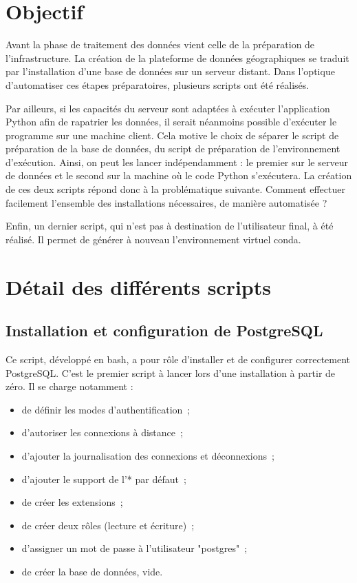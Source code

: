 \section{Objectif}

Avant la phase de traitement des données  vient celle de la préparation de l'infrastructure. La création de la plateforme de données géographiques se traduit par l'installation d'une base de données sur un serveur distant. Dans l'optique d'automatiser ces étapes préparatoires, plusieurs scripts ont été réalisés.

Par ailleurs, si les capacités du serveur sont adaptées à exécuter l'application Python afin de rapatrier les données, il serait néanmoins possible d'exécuter le programme sur une machine client. Cela motive le choix de séparer le script de préparation de la base de données, du script de préparation de l'environnement d'exécution. Ainsi, on peut les lancer indépendamment : le premier sur le serveur de données et le second sur la machine où le code Python s'exécutera. La création de ces deux scripts répond donc à la problématique suivante. Comment effectuer facilement l'ensemble des installations nécessaires, de manière automatisée ?

Enfin, un dernier script, qui n'est pas à destination de l'utilisateur final, à été réalisé. Il permet de générer à nouveau l'environnement virtuel conda.

\section{Détail des différents scripts}

  \subsection{Installation et configuration de PostgreSQL}

Ce script, développé en bash, a pour rôle d'installer et de configurer correctement PostgreSQL. C'est le premier script à lancer lors d'une installation à partir de zéro. Il se charge notamment :

\begin{itemize}
  \item de définir les modes d'authentification~;
  \item d'autoriser les connexions à distance~;
  \item d'ajouter la journalisation des connexions et déconnexions~;
  \item d'ajouter le support de l'* par défaut~;
  \item de créer les extensions~;
  \item de créer deux rôles (lecture et écriture)~;
  \item d'assigner un mot de passe à l'utilisateur "postgres"~;
  \item de créer la base de données, vide.
\end{itemize}

